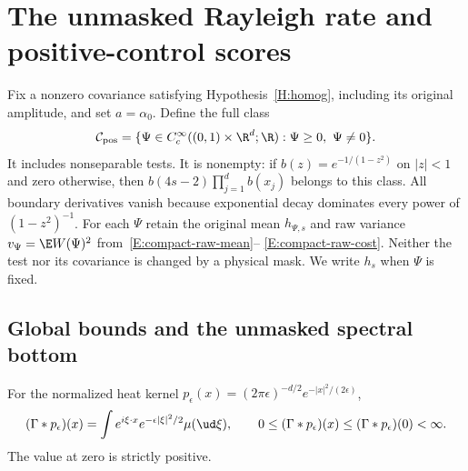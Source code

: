 \section{The unmasked Rayleigh rate and positive-control scores}
\label{S:unmasked-variational}

Fix a nonzero covariance satisfying Hypothesis~\ref{H:homog}, including
its original amplitude, and set $a=\alpha_0$. Define the full class
\begin{equation}\label{E:variational-positive-class}
  \mathcal C_{\mathrm{pos}}
  =\{\Psi\in C_c^\infty((0,1)\times\R^d;\R):
  \Psi\ge0,\ \Psi\ne0\}.
\end{equation}
It includes nonseparable tests. It is nonempty: if
$b(z)=e^{-1/(1-z^2)}$ on $|z|<1$ and zero otherwise, then
$b(4s-2)\prod_{j=1}^db(x_j)$ belongs to this class.
All boundary derivatives vanish because exponential decay dominates
every power of $(1-z^2)^{-1}$.
For each $\Psi$ retain the original mean $h_{\Psi,s}$ and raw variance
$v_\Psi=\E W(\Psi)^2$ from~\eqref{E:compact-raw-mean}--%
\eqref{E:compact-raw-cost}. Neither the test nor its covariance is
changed by a physical mask. We write $h_s$ when $\Psi$ is fixed.

\subsection{Global bounds and the unmasked spectral bottom}

\begin{lemma}
  \label{L:variational-heat-envelope}
  For the normalized heat kernel
  $p_\epsilon(x)=(2\pi\epsilon)^{-d/2}e^{-|x|^2/(2\epsilon)}$,
  \begin{equation}\label{E:variational-heat-envelope}
    (\Gamma*p_\epsilon)(x)
    =\int e^{i\xi\cdot x}e^{-\epsilon|\xi|^2/2}\mu(\ud\xi),
    \qquad
    0\le(\Gamma*p_\epsilon)(x)
    \le(\Gamma*p_\epsilon)(0)<\infty.
  \end{equation}
  The value at zero is strictly positive.
\end{lemma}

